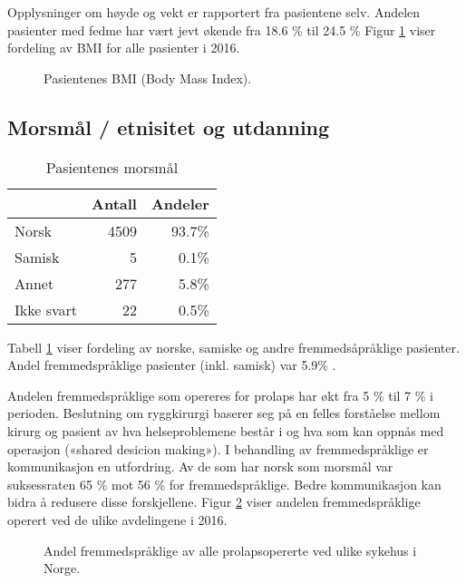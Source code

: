 \documentclass [norsk,a4paper,twoside]{article}\usepackage[]{graphicx}\usepackage[]{color}
\begin{document}
Opplysninger om høyde og vekt er rapportert fra pasientene selv.
Andelen pasienter med fedme har vært jevt økende fra 18.6 \%
til 24.5 \%
Figur \ref{fig:BMI} viser fordeling av BMI for alle pasienter i 2016. 

\begin{figure}[ht]
\caption{\label{fig:BMI} Pasientenes BMI (Body Mass Index).}
\end{figure}





\subsection{Morsmål / etnisitet og utdanning}

\begin{table}[ht]
\centering
\begin{tabular}{lrr}
  \hline
 & Antall & Andeler \\ 
  \hline
Norsk & 4509 & 93.7\% \\ 
  Samisk & 5 & 0.1\% \\ 
  Annet & 277 & 5.8\% \\ 
  Ikke svart & 22 & 0.5\% \\ 
   \hline
\end{tabular}
\caption{Pasientenes morsmål} 
\label{tab:Morsm}
\end{table}


Tabell \ref{tab:Morsm} viser fordeling av norske, samiske og andre fremmedsåpråklige pasienter.
Andel fremmedspråklige pasienter (inkl. samisk) var 5.9\% . 

Andelen fremmedspråklige som opereres for prolaps har økt fra 5 \% til 7 \% i perioden.
Beslutning om ryggkirurgi baserer seg på en felles forståelse mellom kirurg og
pasient av hva helseproblemene består i og hva som kan oppnås med operasjon
(«shared desicion making»). I behandling av fremmedspråklige er kommunikasjon
en utfordring. Av de som har norsk som morsmål var suksessraten 65 \% mot 56 \%
for fremmedspråklige. Bedre kommunikasjon kan bidra å redusere disse
forskjellene. Figur \ref{fig:Morsmal} viser andelen fremmedspråklige operert ved de ulike avdelingene i 2016.

\begin{figure}[ht]
\caption{\label{fig:Morsmal} Andel fremmedspråklige av alle prolapsopererte ved ulike sykehus i
Norge.}
\end{figure}
\end{document}
